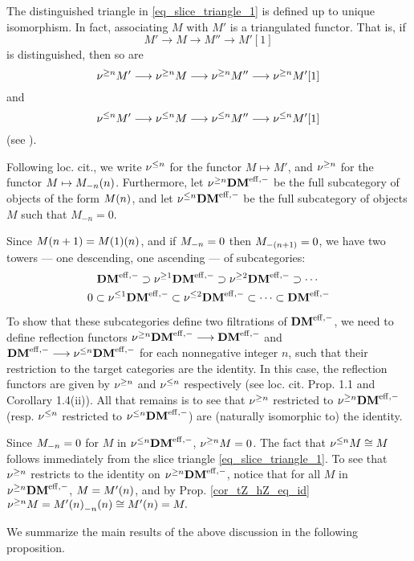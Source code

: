 The distinguished triangle in \eqref{eq_slice_triangle_1} is 
defined up to unique isomorphism. In fact, associating $M$ with $M'$ is a triangulated 
functor. That is, if
\[
M' \to M \to M'' \to M'[1]
\]
is distinguished, then so are
\[
\sgDM{n}M' \to \sgDM{n}M \to \sgDM{n}M'' \to \sgDM{n}M'[1]
\]
and
\[
\slDM{n}M' \to \slDM{n}M \to \slDM{n}M'' \to \slDM{n}M'[1]
\]
(see \cite[1.4]{HuKa}).

Following loc. cit., we write $\slDM{n}$ for the functor $M 
\mapsto M'$, and $\sgDM{n}$ for the functor $M \mapsto 
\tZ[n]{\hZ[n]{M}}$. Furthermore, let $\sgDM{n}\DMeff$ be the full
subcategory of objects of the form $\tZ[n]{M}$, and let 
$\slDM{n} \DMeff$ be the full subcategory of objects $M$ such 
that $M_{-n} = 0$.

Since $\tZ[n + 1]{M} = \tZ[n]{\tZ[1]{M}}$, and if $\hZ[n]{M} = 0$
then $\hZ[(n + 1)]{M} = 0$, we have two towers --- one descending, one 
ascending --- of subcategories:
\begin{equation}
\DMeff \supset \sgDM{1}\DMeff \supset \sgDM{2}\DMeff \supset \cdots \\
\end{equation}
\vskip 5pt
\begin{equation}
0 \subset \slDM{1}\DMeff \subset \slDM{2}\DMeff \subset \cdots \subset
\DMeff
\end{equation}

To show that these subcategories define two filtrations of 
$\DMeff$, we need to define reflection functors $\sgDM{n}\DMeff 
\to \DMeff$ and $\DMeff \to \slDM{n}\DMeff$ for each nonnegative 
integer $n$, such that their restriction to the target categories 
are the identity. In this case, the reflection functors are given 
by $\sgDM{n}$ and $\slDM{n}$ respectively (see loc. cit. Prop. 1.1 
and Corollary 1.4(ii)). All that remains is to see that $\sgDM{n}$ 
restricted to $\sgDM{n}\DMeff$ (resp. $\slDM{n}$ restricted to 
$\slDM{n}\DMeff$) are (naturally isomorphic to) the identity.

Since $\hZ[n]{M} = 0$ for $M$ in $\slDM{n}\DMeff$, $\sgDM{n} M = 
0$. The fact that $\slDM{n} M \cong M$ follows immediately from 
the slice triangle \eqref{eq_slice_triangle_1}. To see that 
$\sgDM{n}$ restricts to the identity on $\sgDM{n} \DMeff$, notice 
that for all $M$ in $\sgDM{n} \DMeff$, $M = \tZ[n]{M'}$, and by 
Prop. \ref{cor_tZ_hZ_eq_id} $\sgDM{n}M = 
\tZ[n]{\hZ[n]{\tZ[n]{M'}}} \cong \tZ[n]{M'} = M.$

We summarize the main results of the above discussion in the 
following proposition.

